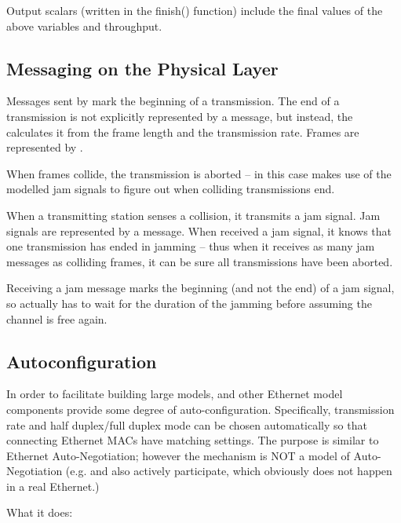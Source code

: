 Output scalars (written in the finish() function) include the final values of
the above variables and throughput.


\subsection{Messaging on the Physical Layer}

Messages sent by  mark the beginning of a transmission.
The end of a transmission is not explicitly represented by a message,
but instead, the  calculates it from the frame length and
the transmission rate. Frames are represented by .

When frames collide, the transmission is aborted -- in this case
 makes use of the modelled jam signals to figure out
when colliding transmissions end.

When a transmitting station senses a collision, it transmits a jam signal.
Jam signals are represented by a  message.
When  received a jam signal, it knows that one transmission
has ended in jamming -- thus when it receives as many jam messages
as colliding frames, it can be sure all transmissions have been aborted.

Receiving a jam message marks the beginning (and not the end)
of a jam signal, so actually  has to wait for the duration
of the jamming before assuming the channel is free again.

\subsection{Autoconfiguration}

In order to facilitate building large models,  and other Ethernet model
components provide some degree of auto-configuration. Specifically, transmission
rate and half duplex/full duplex mode can be chosen automatically so that
connecting Ethernet MACs have matching settings. The purpose is similar to
Ethernet Auto-Negotiation; however the mechanism is NOT a model of
Auto-Negotiation (e.g.  and  also actively participate,
which obviously does not happen in a real Ethernet.)

What it does:

